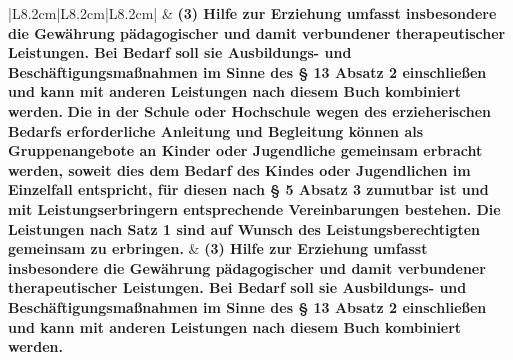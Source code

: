 \documentclass[10pt,a4paper,landscape]{article}
\begin{document}
\begin{longtable}{|L{8.2cm}|L{8.2cm}|L{8.2cm}|}
 & \textbf{(3) Hilfe zur Erziehung umfasst  \newline insbesondere die Gewährung  \newline pädagogischer und damit verbundener  \newline therapeutischer Leistungen. Bei Bedarf  \newline soll sie Ausbildungs- und  \newline Beschäftigungsmaßnahmen im Sinne  \newline des \S{} 13 Absatz 2 einschließen und  \newline kann mit anderen Leistungen nach  \newline diesem Buch kombiniert werden. }\textbf{\textcolor{diffred}{Die in  \newline der Schule oder Hochschule wegen des  \newline erzieherischen Bedarfs erforderliche  \newline Anleitung und Begleitung können als  \newline Gruppenangebote an Kinder oder  \newline Jugendliche gemeinsam erbracht  \newline werden, soweit dies dem Bedarf des  \newline Kindes oder Jugendlichen im Einzelfall  \newline entspricht, für diesen nach \S{} 5 Absatz 3  \newline zumutbar ist und mit  \newline Leistungserbringern entsprechende  \newline Vereinbarungen bestehen. Die  \newline Leistungen nach Satz 1 sind auf  \newline Wunsch des Leistungsberechtigten  \newline gemeinsam zu erbringen.}} & \textbf{(3) Hilfe zur Erziehung umfasst  \newline insbesondere die Gewährung  \newline pädagogischer und damit verbundener  \newline therapeutischer Leistungen. Bei Bedarf  \newline soll sie Ausbildungs- und  \newline Beschäftigungsmaßnahmen im Sinne  \newline des \S{} 13 Absatz 2 einschließen und  \newline kann mit anderen Leistungen nach  \newline diesem Buch kombiniert werden.  } \\

\end{longtable}
\end{document}
